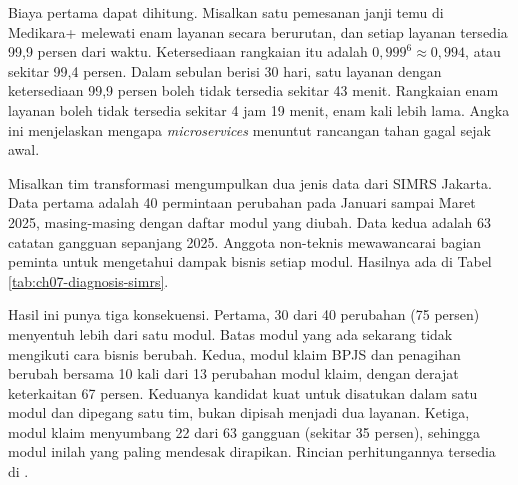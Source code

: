 Biaya pertama dapat dihitung. Misalkan satu pemesanan janji temu di Medikara+ melewati enam layanan
secara berurutan, dan setiap layanan tersedia 99,9 persen dari waktu. Ketersediaan rangkaian itu
adalah $0{,}999^{6} \approx 0{,}994$, atau sekitar 99,4 persen. Dalam sebulan berisi 30 hari, satu
layanan dengan ketersediaan 99,9 persen boleh tidak tersedia sekitar 43 menit. Rangkaian enam
layanan boleh tidak tersedia sekitar 4 jam 19 menit, enam kali lebih lama. Angka ini menjelaskan
mengapa \textit{microservices} menuntut rancangan tahan gagal sejak awal.

\begin{kasus}[title={Kasus Medikara Health: Diagnosis Coupling SIMRS Jakarta}]
  Misalkan tim transformasi mengumpulkan dua jenis data dari SIMRS Jakarta. Data pertama adalah 40
  permintaan perubahan pada Januari sampai Maret 2025, masing-masing dengan daftar modul yang
  diubah. Data kedua adalah 63 catatan gangguan sepanjang 2025. Anggota non-teknis mewawancarai
  bagian peminta untuk mengetahui dampak bisnis setiap modul. Hasilnya ada di Tabel
  \ref{tab:ch07-diagnosis-simrs}.

  Hasil ini punya tiga konsekuensi. Pertama, 30 dari 40 perubahan (75 persen) menyentuh lebih dari
  satu modul. Batas modul yang ada sekarang tidak mengikuti cara bisnis berubah. Kedua, modul klaim
  BPJS dan penagihan berubah bersama 10 kali dari 13 perubahan modul klaim, dengan derajat
  keterkaitan 67 persen. Keduanya kandidat kuat untuk disatukan dalam satu modul dan dipegang satu
  tim, bukan dipisah menjadi dua layanan. Ketiga, modul klaim menyumbang 22 dari 63 gangguan
  (sekitar 35 persen), sehingga modul inilah yang paling mendesak dirapikan. Rincian perhitungannya
  tersedia di .
\end{kasus}

